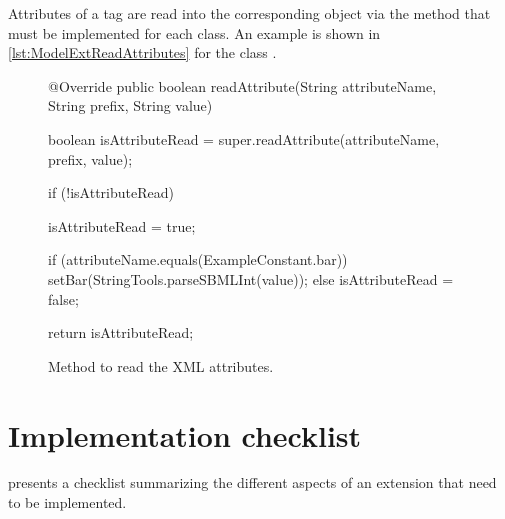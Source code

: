 Attributes of a tag are read into the corresponding object via the
 method that must be implemented for each class.  An
example is shown in \vref{lst:ModelExtReadAttributes} for the class
.

\begin{figure}[htb]
  \begin{example}[numbers=left]
@Override
public boolean readAttribute(String attributeName, String prefix, String value) {

  boolean isAttributeRead = super.readAttribute(attributeName, prefix, value);

  if (!isAttributeRead) {
    isAttributeRead = true;

    if (attributeName.equals(ExampleConstant.bar)) {
      setBar(StringTools.parseSBMLInt(value));
    } else {
      isAttributeRead = false;
    }
  }

  return isAttributeRead;
}\end{example}
  \caption{Method to read the XML attributes.}
  \label{lst:ModelExtReadAttributes}
\end{figure}


\section{Implementation checklist}

 presents a checklist summarizing the different
aspects of an extension that need to be implemented.

\newcommand{\fooname}{\code{\emph{\underline{\color{winered}Foo}}}}
\newcommand{\barname}{\code{\emph{\underline{\color{winered}Bar}}}}

